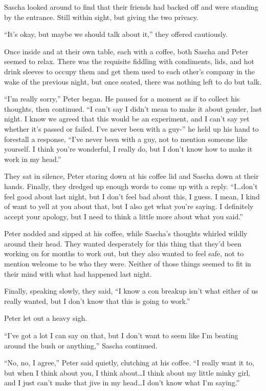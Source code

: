Sascha looked around to find that their friends had backed off and were standing by the entrance. Still within sight, but giving the two privacy.

``It's okay, but maybe we should talk about it,'' they offered cautiously.

Once inside and at their own table, each with a coffee, both Sascha and Peter seemed to relax. There was the requisite fiddling with condiments, lids, and hot drink sleeves to occupy them and get them used to each other's company in the wake of the previous night, but once seated, there was nothing left to do but talk.

``I'm really sorry,'' Peter began. He paused for a moment as if to collect his thoughts, then continued. ``I can't say I didn't mean to make it about gender, last night. I know we agreed that this would be an experiment, and I can't say yet whether it's passed or failed. I've never been with a guy-'' he held up his hand to forestall a response, ``I've never been with a guy, not to mention someone like yourself. I think you're wonderful, I really do, but I don't know how to make it work in my head.''

They sat in silence, Peter staring down at his coffee lid and Sascha down at their hands. Finally, they dredged up enough words to come up with a reply. ``I\ldots{}don't feel good about last night, but I don't feel bad about this, I guess. I mean, I kind of want to yell at you about that, but I also get what you're saying. I definitely accept your apology, but I need to think a little more about what you said.''

Peter nodded and sipped at his coffee, while Sascha's thoughts whirled wildly around their head. They wanted desperately for this thing that they'd been working on for months to work out, but they also wanted to feel safe, not to mention welcome to be who they were. Neither of those things seemed to fit in their mind with what had happened last night.

Finally, speaking slowly, they said, ``I know a con breakup isn't what either of us really wanted, but I don't know that this is going to work.''

Peter let out a heavy sigh.

``I've got a lot I can say on that, but I don't want to seem like I'm beating around the bush or anything,'' Sascha continued.

``No, no, I agree,'' Peter said quietly, clutching at his coffee. ``I really want it to, but when I think about you, I think about\ldots{}I think about my little minky girl, and I just can't make that jive in my head\ldots{}I don't know what I'm saying.''

